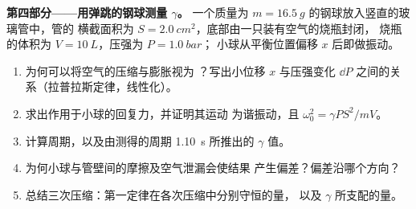 \begin{problem}
\medskip
\noindent\textbf{第四部分——用弹跳的钢球测量 $\gamma$。}
一个质量为 $m = \qty{16.5}{g}$ 的钢球放入竖直的玻璃管中，管的
横截面积为 $S = \qty{2.0}{cm^2}$，底部由一只装有空气的烧瓶封闭，
烧瓶的体积为 $V = \qty{10}{L}$，压强为 $P = \qty{1.0}{bar}$；
小球从平衡位置偏移 $x$ 后即做振动。
\begin{enumerate}[resume]
  \item 为何可以将空气的压缩与膨胀视为
        ？写出小位移 $x$ 与压强变化
        $\dd P$ 之间的关系（拉普拉斯定律，线性化）。
  \item 求出作用于小球的回复力，并证明其运动
        为谐振动，且 $\omega_0^2 = \gamma PS^2/mV$。
  \item 计算周期，以及由测得的周期 \qty{1.10}{s}
        所推出的 $\gamma$ 值。
  \item 为何小球与管壁间的摩擦及空气泄漏会使结果
        产生偏差？偏差沿哪个方向？
  \item 总结三次压缩：第一定律在各次压缩中分别守恒的量，
        以及 $\gamma$
        所支配的量。
\end{enumerate}
\end{problem}

